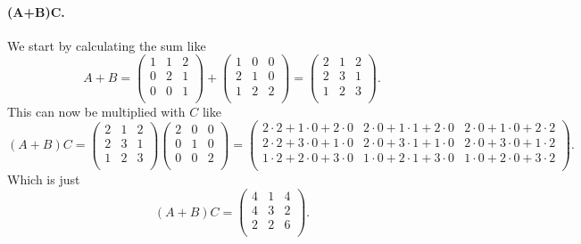 \paragraph{(A+B)C.} We start by calculating the sum like
\[ 
A + B = \begin{pmatrix}
1 & 1 & 2\\
0 & 2 & 1\\
0 & 0 & 1\\
\end{pmatrix} + \begin{pmatrix}
1 & 0 & 0\\
2 & 1 & 0\\
1 & 2 & 2\\
\end{pmatrix} = \begin{pmatrix}
2 & 1 & 2\\
2 & 3 & 1\\
1 & 2 & 3\\
\end{pmatrix}
.\]
This can now be multiplied with $C$ like
\[ 
  (A+B)C = \begin{pmatrix}
  2 & 1 & 2\\
  2 & 3 & 1\\
  1 & 2 & 3\\
  \end{pmatrix} \begin{pmatrix}
  2 & 0 & 0\\
  0 & 1 & 0\\
  0 & 0 & 2\\
  \end{pmatrix} = \begin{pmatrix}
  2 \cdot 2 + 1 \cdot 0 + 2 \cdot 0 & 2 \cdot 0 + 1 \cdot 1 + 2 \cdot 0 & 2 \cdot 0 + 1 \cdot 0 + 2 \cdot 2\\
  2 \cdot 2 + 3 \cdot 0 + 1 \cdot 0 & 2 \cdot 0 + 3 \cdot 1 + 1 \cdot 0 & 2 \cdot 0 + 3 \cdot 0 + 1 \cdot 2\\
  1 \cdot 2 + 2 \cdot 0 + 3 \cdot 0 & 1 \cdot 0 + 2 \cdot 1 + 3 \cdot 0 & 1 \cdot 0 + 2 \cdot 0 + 3 \cdot 2\\
  \end{pmatrix}
.\]
Which is just
\[ 
  (A+B)C = \begin{pmatrix}
  4 & 1 & 4\\
  4 & 3 & 2\\
  2 & 2 & 6\\
  \end{pmatrix}
.\]

